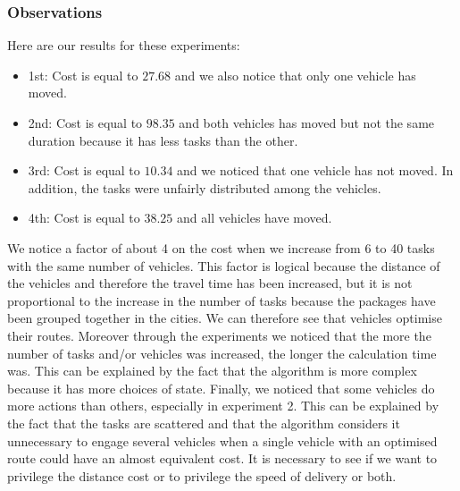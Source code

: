 \documentclass[11pt]{article}
\begin{document}
\subsubsection{Observations}
Here are our results for these experiments:
\begin{itemize}
    \item 1st: Cost is equal to $27.68$ and we also notice that only one vehicle has moved.
    \item 2nd: Cost is equal to $98.35$ and both vehicles has moved but not the same duration because it has less tasks than the other.
    \item 3rd: Cost is equal to $10.34$ and we noticed that one vehicle has not moved. In addition, the tasks were unfairly distributed among the vehicles.
    \item 4th: Cost is equal to $38.25$ and all vehicles have moved.
\end{itemize}

We notice a factor of about 4 on the cost when we increase from 6 to 40 tasks with the same number of vehicles. This factor is logical because the distance of the vehicles and therefore the travel time has been increased, but it is not proportional to the increase in the number of tasks because the packages have been grouped together in the cities. We can therefore see that vehicles optimise their routes. Moreover through the experiments we noticed that the more the number of tasks and/or vehicles was increased, the longer the calculation time was. This can be explained by the fact that the algorithm is more complex because it has more choices of state. Finally, we noticed that some vehicles do more actions than others, especially in experiment 2. This can be explained by the fact that the tasks are scattered and that the algorithm considers it unnecessary to engage several vehicles when a single vehicle with an optimised route could have an almost equivalent cost. It is necessary to see if we want to privilege the distance cost or to privilege the speed of delivery or both.
\end{document}
